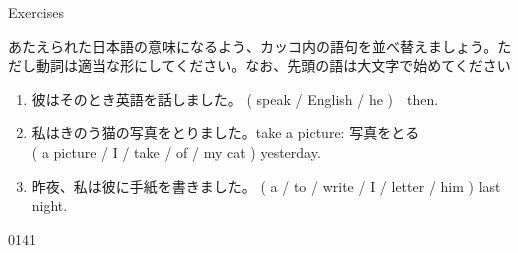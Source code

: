 \documentclass[aspectratio=169,xcolor={dvipsnames,table}]{beamer}
\newcommand{\myaudio}[1]{\href{#1}{\faVolumeUp}}
\begin{document}
\begin{frame}[plain]{Exercises}

{\small あたえられた日本語の意味になるよう、カッコ内の語句を並べ替えましょう。ただし動詞は適当な形にしてください。なお、先頭の語は大文字で始めてください}


\begin{enumerate}
 \item {\small 彼はそのとき英語を話しました。}%
\hfill{}( speak / English  / he )~~then.\\
 \item {\small 私はきのう猫の写真をとりました。}\hfill{\scriptsize take a picture: 写真をとる}\\
\mbox{}\hfill{}( a picture / I / take / of / my cat ) yesterday.\\
 \item {\small 昨夜、私は彼に手紙を書きました。}
( a / to / write / I / letter / him ) last night.\\
\end{enumerate}
\hfill{\tiny 0141}\,{\scriptsize \myaudio{./audio/025_past_do_17.mp3}}

\end{frame}
\end{document}
